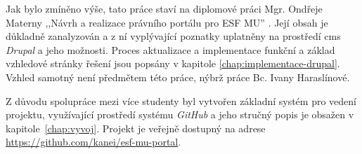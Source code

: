 Jak bylo zmíněno výše, tato práce staví na diplomové práci Mgr. Ondřeje Materny ,,Návrh a realizace právního portálu pro ESF MU'' \cite{omaterna2013}. Její obsah je důkladně zanalyzován a z ní vyplývající poznatky uplatněny na prostředí \gls{cms} \emph{Drupal} a jeho možnosti. Proces aktualizace a implementace funkční a základ vzhledové stránky řešení jsou popsány v kapitole  \ref{chap:implementace-drupal}. Vzhled samotný není předmětem této práce, nýbrž práce Bc. Ivany Haraslínové. 

Z důvodu spolupráce mezi více studenty byl vytvořen základní systém pro vedení projektu, využívající prostředí systému \emph{GitHub} a jeho stručný popis je obsažen v kapitole~\ref{chap:vyvoj}. Projekt je veřejně dostupný na adrese \url{https://github.com/kanei/esf-mu-portal}.
